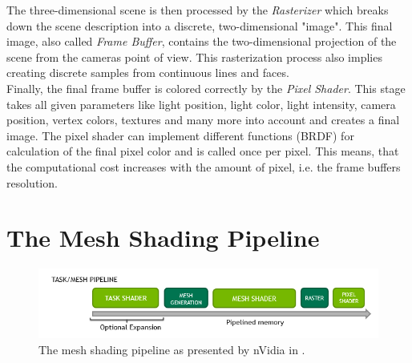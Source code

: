 \noindent
The three-dimensional scene is then processed by the \emph{Rasterizer} which breaks down the scene description into 
a discrete, two-dimensional "image". This final image, also called \emph{Frame Buffer}, contains the two-dimensional 
projection of the scene from the cameras point of view. This rasterization process also implies creating discrete 
samples from continuous lines and faces. \\

\noindent
Finally, the final frame buffer is colored correctly by the \emph{Pixel Shader}. This stage takes all given parameters 
like light position, light color, light intensity, camera position, vertex colors, textures and many more into account 
and creates a final image. The pixel shader can implement different functions (\ac{BRDF}) for calculation of the final pixel color 
and is called once per pixel. This means, that the computational cost increases with the amount of pixel, i.e. the frame 
buffers resolution. \\












\section{The Mesh Shading Pipeline} \label{sec-mesh-shading-pipeline}


\begin{figure}[h]
    \centering
    \includegraphics[width=\linewidth]{images/graphics/mesh-rendering-pipeline.png}
    \caption{The mesh shading pipeline as presented by nVidia in \cite[Christoph Kubisch]{Kubisch2018}.}
    \label{fig:mesh-rendering-pipeline}
\end{figure}


